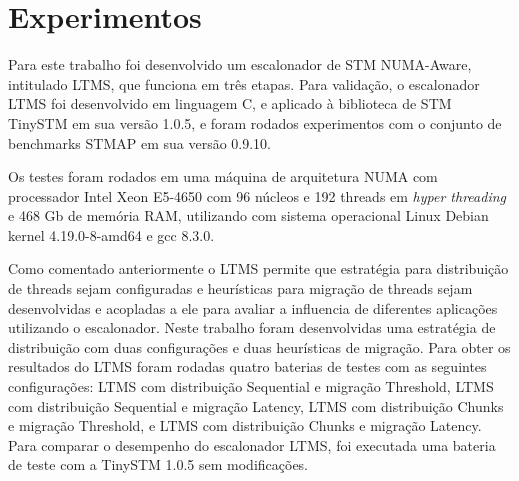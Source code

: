 \documentclass[diss,capa]{texufpel}
\begin{document}





\chapter{Experimentos}
\label{chapter::experimentos}

Para este trabalho foi desenvolvido um escalonador de STM NUMA-Aware, intitulado LTMS, que funciona em três etapas. Para validação, o escalonador LTMS foi desenvolvido em linguagem C, e aplicado à biblioteca de STM TinySTM em sua versão 1.0.5, e foram rodados experimentos com o conjunto de benchmarks STMAP em sua versão 0.9.10.

Os testes foram rodados em uma máquina de arquitetura NUMA com processador Intel Xeon E5-4650 com 96 núcleos e 192 threads em \emph{hyper threading} e 468 Gb de memória RAM, utilizando com sistema operacional Linux Debian kernel 4.19.0-8-amd64  e gcc 8.3.0.

Como comentado anteriormente o LTMS permite que estratégia para distribuição de threads sejam configuradas e heurísticas para migração de threads sejam desenvolvidas e acopladas a ele para avaliar a influencia de diferentes aplicações utilizando o escalonador. Neste trabalho foram desenvolvidas uma estratégia de distribuição com duas configurações e duas heurísticas de migração. Para obter os resultados do LTMS foram rodadas quatro baterias de testes com as seguintes configurações: LTMS com distribuição Sequential e migração Threshold, LTMS com distribuição Sequential e migração Latency, LTMS com distribuição Chunks e migração Threshold, e LTMS com distribuição Chunks e migração Latency. Para comparar o desempenho do escalonador LTMS, foi executada uma bateria de teste com a TinySTM 1.0.5 sem modificações.
\end{document}
